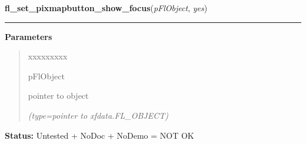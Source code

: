     \label{xformslib:flbutton:fl_set_pixmapbutton_focus_outline}

    \vspace{0.5ex}

\hspace{.8\funcindent}\begin{boxedminipage}{\funcwidth}

    \raggedright \textbf{fl\_set\_pixmapbutton\_show\_focus}(\textit{pFlObject}, \textit{yes})

    \vspace{-1.5ex}

    \rule{\textwidth}{0.5\fboxrule}
\setlength{\parskip}{2ex}
\setlength{\parskip}{1ex}
      \textbf{Parameters}
      \vspace{-1ex}

      \begin{quote}
        \begin{Ventry}{xxxxxxxxx}

          \item[pFlObject]

          pointer to object

            {\it (type=pointer to xfdata.FL\_OBJECT)}

        \end{Ventry}

      \end{quote}

\textbf{Status:} Untested + NoDoc + NoDemo = NOT OK



    \end{boxedminipage}

    \label{xformslib:flbutton:fl_set_pixmapbutton_focus_data}

    \vspace{0.5ex}

